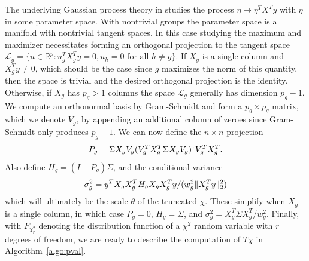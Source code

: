 \documentclass[oupdraft]{bio}
\def\real{{\mathbb R}}
\newcommand{\norm}[1]{\lVert #1 \rVert}
\newcommand{\vecsp}{\mathcal{L}}
\begin{document}
The underlying Gaussian process theory in \cite{tests:adaptive} studies the process $\eta \mapsto \eta^TX^Ty$ with $\eta$ in some parameter space. With nontrivial groups the parameter space is a manifold with nontrivial tangent spaces. In this case studying the maximum and maximizer necessitates forming an orthogonal projection to the tangent space $\vecsp_g = \{ u \in \real^p : u_g^T X_g^T y = 0, u_h = 0 \text{ for all } h \neq g \}$. If $X_g$ is a single column and $X_g^Ty \neq 0$, which should be the case since $g$ maximizes the norm of this quantity, then the space is trivial and the desired orthogonal projection is the identity. Otherwise, if $X_g$ has $p_g > 1$ columns the space $\vecsp_g$ generally has dimension $p_g-1$. We compute an orthonormal basis by Gram-Schmidt and form a $p_g \times p_g$ matrix, which we denote $V_g$, by appending an additional column of zeroes since Gram-Schmidt only produces $p_g-1$. We can now define the $n \times n$ projection
\begin{equation}
   \label{eq:proj}
   P_g = \Sigma X_gV_g (V_g^T X_g^T \Sigma X_g V_g)^\dagger V_g^TX_g^T. \\
\end{equation}
Also define $H_g = (I-P_g)\Sigma$, and the conditional variance
\begin{equation}
   \label{eq:cvar}
   \sigma^2_g = y^TX_gX_g^T H_g X_gX_g^Ty / (w_g^2 \norm{X_g^Ty}_2^2) \\
\end{equation}
which will ultimately be the scale $\theta$ of the truncated $\chi$.
These simplify when $X_g$ is a single column, in which case $P_g = 0$,
$H_g = \Sigma$, and $\sigma^2_g = X_g^T\Sigma X_g^T/w_g^2$.
Finally, with $F_{\chi^2_r}$ denoting the distribution function of a $\chi^2$ random variable with $r$ degrees of freedom, we are ready to describe the computation of $T\chi$ in Algorithm~\ref{algo:pval}.
\end{document}
